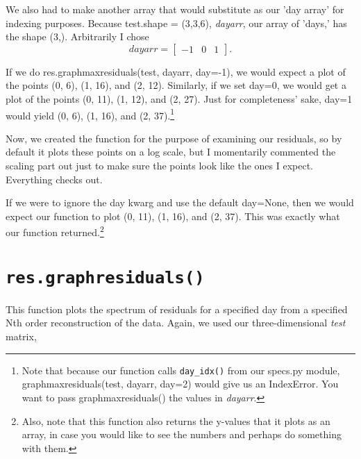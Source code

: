 \documentclass{article}
\begin{document}
We also had to make another array that would substitute as our 'day
array' for indexing purposes.  Because test.shape = (3,3,6),
\textit{dayarr}, our array of 'days,' has the shape (3,).  Arbitrarily
I chose \[dayarr=\left[\begin{array}{ccc} -1 & 0 & 1 \end{array}\right]. \]

If we do res.graphmaxresiduals(test, dayarr, day=-1), we would expect
a plot of the points (0, 6), (1, 16), and (2, 12).  Similarly, if we set
day=0, we would get a plot of the points (0, 11), (1, 12), and (2, 27).
Just for completeness' sake, day=1 would yield (0, 6), (1, 16), and
(2, 37).\footnote{Note that because our function calls \texttt{day\_idx()} from our
specs.py module, graphmaxresiduals(test, dayarr, day=2) would give us
an IndexError.  You want to pass graphmaxresiduals() the values in \emph{dayarr}.}

Now, we created the function for the purpose of examining our
residuals, so by default it plots these points on a log scale, but I
momentarily commented the scaling part out just to make sure the
points look like the ones I expect.  Everything checks out.

If we were to ignore the day kwarg and use the default day=None, then
we would expect our function to plot (0, 11), (1, 16), and (2, 37).
This was exactly what our function returned.\footnote{Also, note that
  this function also returns the y-values that it plots as an array,
  in case you would like to see the numbers and perhaps do something with them.}


\section{\texttt{res.graphresiduals()}}
\label{sec:graphmaxresiduals}

This function plots the spectrum of residuals for a specified day from
a specified Nth order reconstruction of the data.  Again, we used our
three-dimensional \textit{test} matrix,
\end{document}
